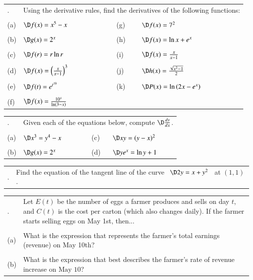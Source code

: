 \documentclass[11pt]{article}
\begin{document}
{\setlength{\extrarowheight}{-0.1cm}
\begin{tabular}{p{0.24cm}p{6.0cm}p{1.0cm}p{0.24cm}p{6.0cm}}
	\arabic{N}. & \multicolumn{4}{l}{Using the derivative rules, find the derivatives of the following functions:}\\
	&\\
	(a) & $\D f(x) = x^5-x$
	&&
	(g) & $\D f(x) = 7^2$ \\
	&\\
	(b) & $\D g(x) = 2^x$
	&&
	(h) & $\D f(x) = \ln x + e^x$ \\
	&\\
	(c) & $\D f(r) = r\ln r$
	&&
	(i) & $\D f(x) = \frac{x}{x-1}$ \\
	&\\
	(d) & $\D f(x) = \left(\frac{x}{x-1}\right)^3$
	&&
	(j) & $\D h(x) = \frac{\sqrt{x^2-1}}{2}$ \\
	&\\
	(e) & $\D f(t) = e^{t^{19}}$
	&&
	(k) & $\D P(x) = \ln \left(2x - e^x\right)$ \\
	&\\
	(f) & $\D f(x) = \frac{10^x}{\ln(3-x)}$ &&&\\
\end{tabular}}

\thispagestyle{empty}
\newpage
\thispagestyle{empty}


{\setlength{\extrarowheight}{-0.1cm}
\begin{tabular}{p{0.24cm}p{6.0cm}p{1.0cm}p{0.24cm}p{6.0cm}}
	\arabic{N}. & \multicolumn{4}{l}{Given each of the equations below, compute $\D \frac{dy}{dx}$.}\\
	&\\
	(a) & $\D x^3 = y^4-x$
	&&
	(c) & $\D xy = (y-x)^2$ \\
	&\\
	(b) & $\D g(x) = 2^x$
	&&
	(d) & $\D ye^x = \ln y + 1$ \\
\end{tabular}}

{\setlength{\extrarowheight}{-0.1cm}
\begin{tabular}{p{0.24cm}p{6.0cm}p{1.0cm}p{0.24cm}p{6.0cm}}
	\arabic{N}. & \multicolumn{4}{l}{Find the equation of the tangent line of the curve \, $\D 2y = x+y^2$ \, at $(1,1)$.}\\
\end{tabular}}

{\setlength{\extrarowheight}{-0.1cm}
\begin{tabular}{p{0.24cm}p{17.8cm}}
	\arabic{N}. & Let $E(t)$ be the number of eggs a farmer produces and sells on day $t$, and $C(t)$ is the cost per carton (which also changes daily). If the farmer starts selling eggs on May 1st, then...\\
	&\\
	(a) & What is the expression that represents the farmer's total earnings (revenue) on May 10th? \\
	&\\
	(b) & What is the expression that best describes the farmer's rate of revenue increase on $\text{May 10}$? \\
\end{tabular}}
\end{document}
